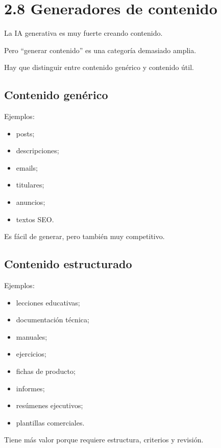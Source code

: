 \section{2.8 Generadores de contenido}\label{generadores-de-contenido}

La IA generativa es muy fuerte creando contenido.

Pero ``generar contenido'' es una categoría demasiado amplia.

Hay que distinguir entre contenido genérico y contenido útil.

\subsection{Contenido genérico}\label{contenido-genuxe9rico}

Ejemplos:

\begin{itemize}
\tightlist
\item
  posts;
\item
  descripciones;
\item
  emails;
\item
  titulares;
\item
  anuncios;
\item
  textos SEO.
\end{itemize}

Es fácil de generar, pero también muy competitivo.

\subsection{Contenido estructurado}\label{contenido-estructurado}

Ejemplos:

\begin{itemize}
\tightlist
\item
  lecciones educativas;
\item
  documentación técnica;
\item
  manuales;
\item
  ejercicios;
\item
  fichas de producto;
\item
  informes;
\item
  resúmenes ejecutivos;
\item
  plantillas comerciales.
\end{itemize}

Tiene más valor porque requiere estructura, criterios y revisión.

